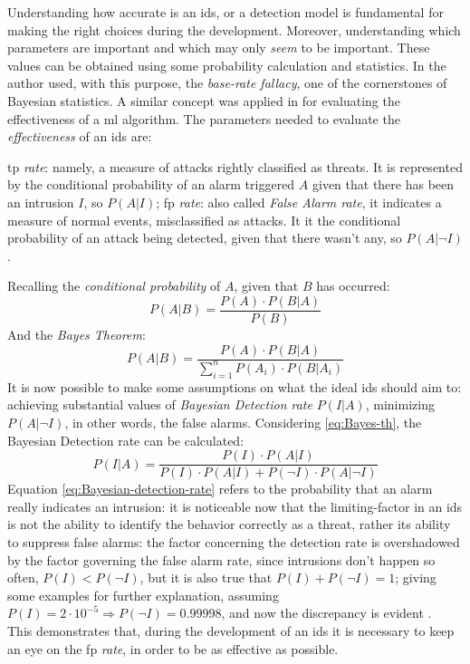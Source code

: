 Understanding how accurate is an \gls{ids}, or a detection model is fundamental for making the right choices during the development. Moreover, understanding which parameters are important and which may only \textit{seem} to be important. These values can be obtained using some probability calculation and statistics. In \cite{Axelsson2000} the author used, with this purpose, the \textit{base-rate fallacy}, one of the cornerstones of Bayesian statistics. A similar concept was applied in \cite{Liu2019} for evaluating the effectiveness of a \gls{ml} algorithm. The parameters needed to evaluate the \textit{effectiveness} of an \gls{ids} are:
\begin{itemize}
    \itemAR \gls{tp} \textit{rate}: namely, a measure of attacks rightly classified as threats. It is represented by the conditional probability of an alarm triggered $A$ given that there has been an intrusion $I$, so $P(A|I)$;
    \itemAR \gls{fp} \textit{rate}: also called \textit{False Alarm rate}, it indicates a measure of normal events, misclassified as attacks. It it the conditional probability of an attack being detected, given that there wasn't any, so $P(A|\neg I)$.
\end{itemize}
Recalling the \textit{conditional probability} of $A$, given that $B$ has occurred:
\begin{equation}
    P(A|B)=\frac{P(A)\cdot P(B|A)}{P(B)}
    \label{eq:conditional-prob}
\end{equation}
And the \textit{Bayes Theorem}:
\begin{equation}
    P(A|B)=\frac{P(A)\cdot P(B|A)}{\sum_{i=1}^nP(A_i)\cdot P(B|A_i)}
    \label{eq:Bayes-th}
\end{equation}
It is now possible to make some assumptions on what the ideal \gls{ids} should aim to: achieving substantial values of \textit{Bayesian Detection rate} $P(I|A)$, minimizing $P(A|\neg I)$, in other words, the false alarms. Considering \ref{eq:Bayes-th}, the Bayesian Detection rate can be calculated:
\begin{equation}
    P(I|A)=\frac{P(I)\cdot P(A|I)}{P(I)\cdot P(A|I)+ P(\neg I)\cdot P(A|\neg I)}
    \label{eq:Bayesian-detection-rate}
\end{equation}
Equation \ref{eq:Bayesian-detection-rate} refers to the probability that an alarm really indicates an intrusion: it is noticeable now that the limiting-factor in an \gls{ids} is not the ability to identify the behavior correctly as a threat, rather its ability to suppress false alarms: the factor concerning the detection rate is overshadowed by the factor governing the false alarm rate, since intrusions don't happen so often, $P(I)<P(\neg I)$, but it is also true that $P(I)+P(\neg I)=1$; giving some examples for further explanation, assuming $P(I)=2\cdot 10^{-5}\Rightarrow P(\neg I)=0.99998$, and now the discrepancy is evident \cite{Axelsson2000}. \\ This demonstrates that, during the development of an \gls{ids} it is necessary to keep an eye on the \gls{fp} \textit{rate}, in order to be as effective as possible.

